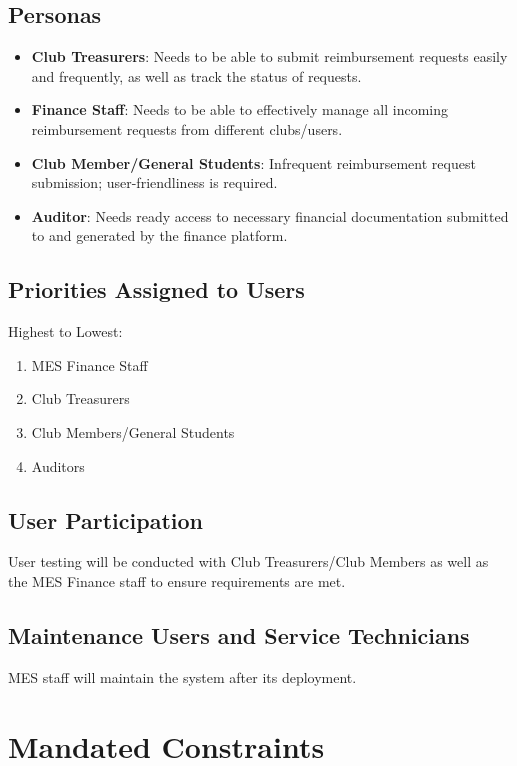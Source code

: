 \documentclass[12pt]{article}
\begin{document}
\subsection{Personas}
\begin{itemize}
    \item \textbf{Club Treasurers}: Needs to be able to submit reimbursement requests easily and frequently, as well as track the status of requests.
    \item \textbf{Finance Staff}: Needs to be able to effectively manage all incoming reimbursement requests from different clubs/users.
    \item \textbf{Club Member/General Students}: Infrequent reimbursement request submission; user-friendliness is required.
    \item \textbf{Auditor}: Needs ready access to necessary financial documentation submitted to and generated by the finance platform.
\end{itemize}

\subsection{Priorities Assigned to Users}
Highest to Lowest:
\begin{enumerate}
    \item MES Finance Staff
    \item Club Treasurers
    \item Club Members/General Students
    \item Auditors
\end{enumerate}

\subsection{User Participation}
User testing will be conducted with Club Treasurers/Club Members as well as the MES Finance staff to ensure requirements are met.

\subsection{Maintenance Users and Service Technicians}
MES staff will maintain the system after its deployment.


\section{Mandated Constraints}
\end{document}
